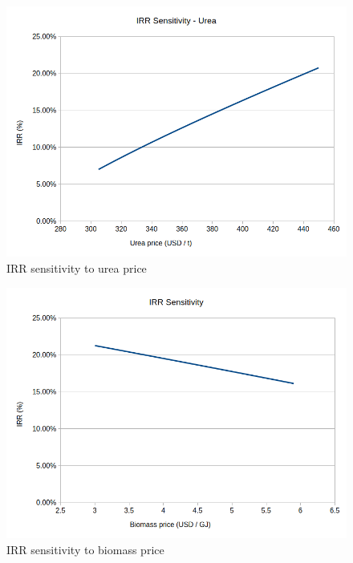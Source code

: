 \documentclass[a4paper, titlepage]{article}
\begin{document}
\begin{figure}
	\includegraphics[width=\textwidth]{img/fig_IRRsensitivity_urea.png}
	\caption{IRR sensitivity to urea price}
	\label{img_IRRsens_urea}
\end{figure}


\begin{figure}
	\includegraphics[width=\textwidth]{img/fig_IRRsensitivity_biomass.png}
	\caption{IRR sensitivity to biomass price}
	\label{img_IRRsens_biomass}

\end{figure}
\end{document}
